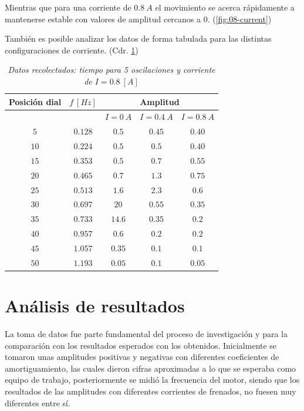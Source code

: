 \documentclass[spanish,notitlepage,letterpaper, 12pt]{article}
\begin{document}
Mientras que para una corriente de $0.8\ A$ el movimiento se acerca rápidamente a mantenerse estable con valores de amplitud cercanos a $0$. (\ref{fig:08-current})\par
\newpage
También es posible analizar los datos de forma tabulada para las distintas configuraciones de corriente. (Cdr. \ref{tab:all-currents})
\begin{table}[ht]
    \centering
    \begin{tabular}{|c|c|c|c|c|}
        \hline
        \textbf{Posición dial} & $f \ [Hz]$ & \multicolumn{3}{|c|}{\textbf{Amplitud}}\\
        \hline
        \multicolumn{2}{|c|}{} & $I=0\ A$ & $I=0.4\ A$ & $I=0.8\ A$\\
        \hline\hline
        $5$ & $0.128$ & $0.5$ & $0.45$ & $0.40$\\
        $10$ & $0.224$ & $0.5$ & $0.5$ & $0.40$\\
        $15$ & $0.353$ & $0.5$ & $0.7$ & $0.55$\\
        $20$ & $0.465$ & $0.7$ & $1.3$ & $0.75$\\
        $25$ & $0.513$ & $1.6$ & $2.3$ & $0.6$\\
        $30$ & $0.697$ & $20$ & $0.55$ & $0.35$\\
        $35$ & $0.733$ & $14.6$ & $0.35$ & $0.2$\\
        $40$ & $0.957$ & $0.6$ & $0.2$ & $0.2$\\
        $45$ & $1.057$ & $0.35$ & $0.1$ & $0.1$\\
        $50$ & $1.193$ & $0.05$ & $0.1$ & $0.05$\\
        \hline
    \end{tabular}
    \caption{\textit{Datos recolectados: tiempo para 5 oscilaciones y corriente de $I=0.8\ [A]$}}
    \label{tab:all-currents}
\end{table}
\section{Análisis de resultados}
La toma de datos fue parte fundamental del proceso de investigación y para la comparación con los resultados esperados con los obtenidos. Inicialmente se tomaron unas amplitudes positivas y negativas con diferentes coeficientes de amortiguamiento, las cuales dieron cifras aproximadas a lo que se
esperaba como equipo de trabajo, posteriormente se midió la frecuencia del motor, siendo que los resultados de las amplitudes con diferentes corrientes de frenados, no fuesen muy diferentes entre sí.
\end{document}
